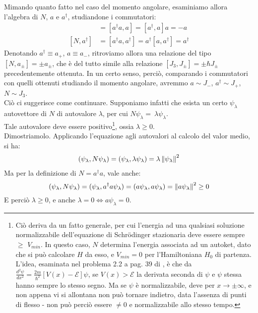 \documentclass[../../FisicaTeorica.tex]{subfiles}
\begin{document}
Mimando quanto fatto nel caso del momento angolare, esaminiamo allora l'algebra di $N$, $a$ e $a^\dag$, studiandone i commutatori:
\begin{align*}
[N,a] &= [a^\dag a, a] = [a^\dag, a]a = -a\\
[N,a^\dag] &= [a^\dag a, a^\dag] = a^\dag[a, a^\dag] = a^\dag
\end{align*}
Denotando $a^\dag \equiv a_+$, $a\equiv a_-$, ritroviamo allora una relazione del tipo $[N,a_\pm]=\pm a_\pm$, che è del tutto simile alla relazione $[J_3, J_\pm]=\pm\hbar J_\pm$ precedentemente ottenuta. In un certo senso, perciò, comparando i commutatori con quelli ottenuti studiando il momento angolare, avremmo $a\sim J_-$, $a^\dag \sim J_+$, $N\sim J_3$.\\
Ciò ci suggerisce come continuare. Supponiamo infatti che esista un certo $\psi_\lambda$ autovettore di $N$ di autovalore $\lambda$, per cui $N\psi_\lambda =\ \lambda \psi_\lambda$.\\
Tale autovalore deve essere positivo\footnote{Ciò deriva da un fatto generale, per cui l'energia  ad una qualsiasi soluzione normalizzabile dell'equazione di Schr\"odinger stazionaria deve essere sempre $\geq$ $V_{min}$. In questo caso, $N$ determina l'energia associata ad un autoket, dato che si può calcolare $H$ da esso, e $V_{min}=0$ per l'Hamiltoniana $H_0$ di partenza. L'idea, esaminata nel problema 2.2 a pag. 39 di \cite{griffiths}, è che da $\frac{d^2\psi}{dx^2}=\frac{2m}{\hbar^2}[V(x)-\mathcal{E}]\psi$, se $V(x)>\mathcal{E}$ la derivata seconda di $\psi$ e $\psi$ stessa hanno sempre lo stesso segno. Ma se $\psi$ è normalizzabile, deve  per $x\to\pm\infty$, e non appena vi si allontana non può tornare indietro, data l'assenza di punti di flesso - non può perciò essere $\neq 0$ e normalizzabile allo stesso tempo.
}, ossia $\lambda \geq 0$.\\
Dimostriamolo. Applicando l'equazione agli autovalori al calcolo del valor medio, si ha:
\begin{align*}
(\psi_\lambda, N\psi_\lambda) = (\psi_\lambda, \lambda \psi_\lambda)=\lambda \left\lVert\psi_\lambda\right\rVert^2
\end{align*}
Ma per la definizione di $N = a^\dag a$, vale anche:
\[
(\psi_\lambda, N\psi_\lambda) = (\psi_\lambda, a^\dag a\psi_\lambda) = (a\psi_\lambda, a\psi_\lambda)= \left\lVert a\psi_\lambda\right\rVert^2 \geq 0
\]
E perciò $\lambda \geq 0$, e anche $\lambda = 0 \Leftrightarrow a\psi_\lambda = 0$.\\
\end{document}

